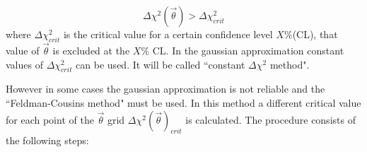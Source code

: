 \begin{equation} \label{eq:condition_cl}
\Delta \chi^2(\vec{\theta}) > \Delta \chi^2_{crit}
\end{equation}
where $\Delta \chi^2_{crit}$ 
is the critical value for a certain confidence level $X\%$(CL),
that value of $\vec{\theta}$ is excluded at the $X\%$ CL.
In the gaussian approximation constant values of $\Delta \chi^2_{crit}$ can be used.
It will be called ``constant $\Delta \chi^2$ method".

However in some cases the gaussian approximation is not reliable
and the ``Feldman-Cousins method" \cite{FeldmanCousins} must be used.
In this method a different critical value for each point of the $\vec{\theta}$ grid 
$\Delta \chi^2 (\vec{\theta})_{crit}$
is calculated.
The procedure consists of the following steps:

